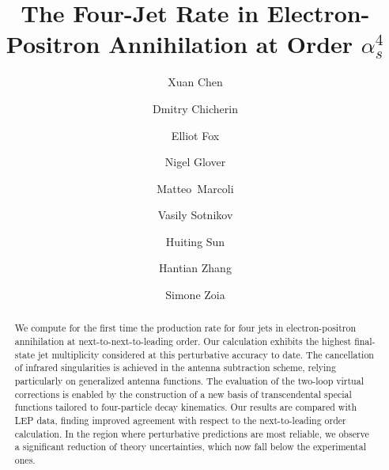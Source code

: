 \documentclass[10pt,aps,prl,superscriptaddress,twocolumn,preprintnumbers,nofootinbib]{revtex4-2}
\begin{document}

\title{The Four-Jet Rate in Electron-Positron Annihilation at Order $\alpha_s^4$}

\author{Xuan Chen}


\author{Dmitry Chicherin}

\author{Elliot Fox}

\author{Nigel Glover}


\author{\mbox{Matteo Marcoli}}

\author{Vasily Sotnikov}


\author{Huiting Sun}

\author{Hantian Zhang}

\author{Simone Zoia}

\begin{abstract}
 We compute for the first time the production rate for four jets in electron-positron annihilation at next-to-next-to-leading order. Our calculation exhibits the highest final-state jet multiplicity considered at this perturbative accuracy to date.
  The cancellation of infrared singularities is achieved in the antenna subtraction scheme, relying particularly on generalized antenna functions.
  The evaluation of the two-loop virtual corrections is enabled by the construction of a new basis of transcendental special functions tailored to four-particle decay kinematics.
  Our results are compared with LEP data, finding improved agreement with respect to the next-to-leading order calculation. In the region where perturbative predictions are most reliable, we observe a significant reduction of theory uncertainties, which now fall below the experimental ones.
\end{abstract}
\end{document}
